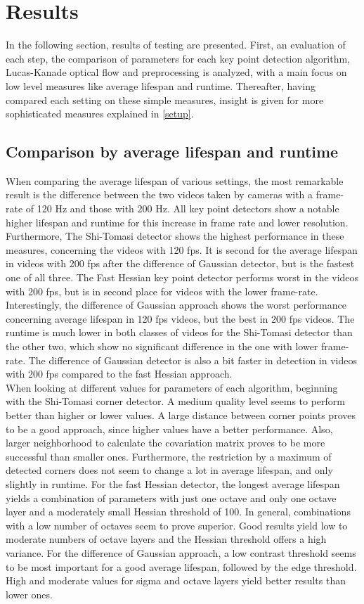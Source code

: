 \documentclass[Bachelorarbeit.tex]{subfiles}
\begin{document}
\newpage
\section{Results}
\label{Results}
In the following section, results of testing are presented. First, an evaluation of each step, the comparison of parameters for each key point detection algorithm, Lucas-Kanade optical flow and preprocessing is analyzed, with a main focus on low level measures like average lifespan and runtime. Thereafter, having compared each setting on these simple measures, insight is given for more sophisticated measures explained in \autoref{setup}.

\subsection{Comparison by average lifespan and runtime}
When comparing the average lifespan of various settings, the most remarkable result is the difference between the two videos taken by cameras with a frame-rate of 120 Hz and those with 200 Hz. All key point detectors show a notable higher lifespan and runtime for this increase in frame rate and lower resolution. Furthermore, The Shi-Tomasi detector shows the highest performance in these measures, concerning the videos with 120 fps. It is second for the average lifespan in videos with 200 fps after the difference of Gaussian detector, but is the fastest one of all three. The Fast Hessian key point detector performs worst in the videos with 200 fps, but is in second place for videos with the lower frame-rate. Interestingly, the difference of Gaussian approach shows the worst performance concerning average lifespan in 120 fps videos, but the best in 200 fps videos. The runtime is much lower in both classes of videos for the Shi-Tomasi detector than the other two, which show no significant difference in the one with lower frame-rate. The difference of Gaussian detector is also a bit faster in detection in videos with 200 fps compared to the fast Hessian approach.\\

When looking at different values for parameters of each algorithm, beginning with the Shi-Tomasi corner detector. A medium quality level seems to perform better than higher or lower values. A large distance between corner points proves to be a good approach, since higher values have a better performance. Also, larger neighborhood to calculate the covariation matrix proves to be more successful than smaller ones. Furthermore, the restriction by a maximum of detected corners does not seem to change a lot in average lifespan, and only slightly in runtime. For the fast Hessian detector, the longest average lifespan yields a combination of parameters with just one octave and only one octave layer and a moderately small Hessian threshold of 100. In general, combinations with a low number of octaves seem to prove superior. Good results yield low to moderate numbers of octave layers and the Hessian threshold offers a high variance.
For the difference of Gaussian approach, a low contrast threshold seems to be most important for a good average lifespan, followed by the edge threshold. High and moderate values for sigma and octave layers yield better results than lower ones.


\FloatBarrier
\end{document}
